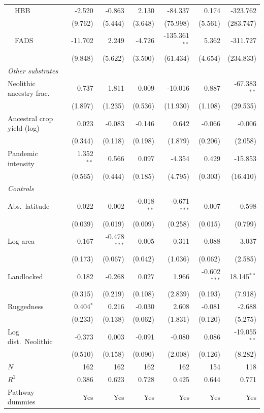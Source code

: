 \begin{tabular}{lrrrrrr}
~~HBB & -2.520 & -0.863 & 2.130 & -84.337 & 0.174 & -323.762 \\
 & (9.762) & (5.444) & (3.648) & (75.998) & (5.561) & (283.747) \\
~~FADS & -11.702 & 2.249 & -4.726 & -135.361$^{**}$ & 5.362 & -311.727 \\
 & (9.848) & (5.622) & (3.500) & (61.434) & (4.654) & (234.833) \\
\multicolumn{7}{l}{\textit{Other substrates}} \\
Neolithic ancestry frac. & 0.737 & 1.811 & 0.009 & -10.016 & 0.887 & -67.383$^{**}$ \\
 & (1.897) & (1.235) & (0.536) & (11.930) & (1.108) & (29.535) \\
Ancestral crop yield (log) & 0.023 & -0.083 & -0.146 & 0.642 & -0.066 & -0.006 \\
 & (0.344) & (0.118) & (0.198) & (1.879) & (0.206) & (2.058) \\
Pandemic intensity & 1.352$^{**}$ & 0.566 & 0.097 & -4.354 & 0.429 & -15.853 \\
 & (0.565) & (0.444) & (0.185) & (4.795) & (0.303) & (16.410) \\
\multicolumn{7}{l}{\textit{Controls}} \\
Abs.\ latitude & 0.022 & 0.002 & -0.018$^{**}$ & -0.671$^{***}$ & -0.007 & -0.598 \\
 & (0.039) & (0.019) & (0.009) & (0.258) & (0.015) & (0.799) \\
Log area & -0.167 & -0.478$^{***}$ & 0.005 & -0.311 & -0.088 & 3.037 \\
 & (0.173) & (0.067) & (0.042) & (1.036) & (0.062) & (2.585) \\
Landlocked & 0.182 & -0.268 & 0.027 & 1.966 & -0.602$^{***}$ & 18.145$^{**}$ \\
 & (0.315) & (0.219) & (0.108) & (2.839) & (0.193) & (7.918) \\
Ruggedness & 0.404$^{*}$ & 0.216 & -0.030 & 2.608 & -0.081 & -2.688 \\
 & (0.233) & (0.138) & (0.062) & (1.831) & (0.120) & (5.275) \\
Log dist.\ Neolithic & -0.373 & 0.003 & -0.091 & -0.080 & 0.086 & -19.055$^{**}$ \\
 & (0.510) & (0.158) & (0.090) & (2.008) & (0.126) & (8.282) \\
\midrule
$N$ & 162 & 162 & 162 & 162 & 154 & 118 \\
$R^2$ & 0.386 & 0.623 & 0.728 & 0.425 & 0.644 & 0.771 \\
Pathway dummies & Yes & Yes & Yes & Yes & Yes & Yes \\
\bottomrule
\end{tabular}
